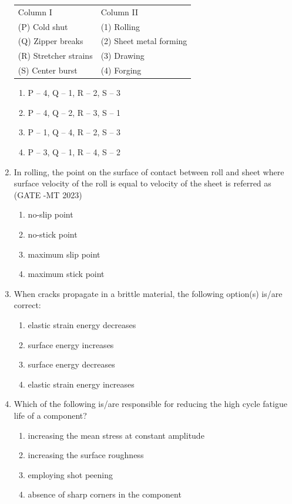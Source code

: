\documentclass[12pt]{article}
\begin{document}
\begin{enumerate}
\begin{center}
\begin{tabular}{ll}
Column I & Column II \\
(P) Cold shut & (1) Rolling \\
(Q) Zipper breaks & (2) Sheet metal forming \\
(R) Stretcher strains & (3) Drawing \\
(S) Center burst & (4) Forging \\
\end{tabular}
\end{center}

\begin{enumerate}[label=(\alph*)]
  \item P – 4, Q – 1, R – 2, S – 3
  \item P – 4, Q – 2, R – 3, S – 1
  \item P – 1, Q – 4, R – 2, S – 3
  \item P – 3, Q – 1, R – 4, S – 2
\end{enumerate}

\item In rolling, the point on the surface of contact between roll and sheet where surface velocity of the roll is equal to velocity of the sheet is referred as  (GATE -MT 2023)
\begin{enumerate}[label=(\alph*)]
  \item no-slip point
  \item no-stick point
  \item maximum slip point
  \item maximum stick point
\end{enumerate}












\item When cracks propagate in a brittle material, the following option(s) is/are correct:
\begin{enumerate}[label=(\alph*)]
\item elastic strain energy decreases
\item surface energy increases
\item surface energy decreases
\item elastic strain energy increases
\end{enumerate}

\item Which of the following is/are responsible for reducing the high cycle fatigue life of a component?
\begin{enumerate}[label=(\alph*)]
\item increasing the mean stress at constant amplitude
\item increasing the surface roughness
\item employing shot peening
\item absence of sharp corners in the component
\end{enumerate}


\end{enumerate}
\end{document}
